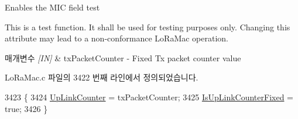 Enables the M\+IC field test 

This is a test function. It shall be used for testing purposes only. Changing this attribute may lead to a non-\/conformance Lo\+Ra\+Mac operation.


\begin{DoxyParams}{매개변수}
{\em \mbox{[}\+I\+N\mbox{]}} & tx\+Packet\+Counter -\/ Fixed Tx packet counter value \\
\hline
\end{DoxyParams}


Lo\+Ra\+Mac.\+c 파일의 3422 번째 라인에서 정의되었습니다.


\begin{DoxyCode}
3423 \{
3424     \mbox{\hyperlink{_lo_ra_mac_8c_ae8c54ca277e4d7295dfd498889e42fdd}{UpLinkCounter}} = txPacketCounter;
3425     \mbox{\hyperlink{_lo_ra_mac_8c_a65360317f68eee4d85b01ed379037fc9}{IsUpLinkCounterFixed}} = \textcolor{keyword}{true};
3426 \}
\end{DoxyCode}
